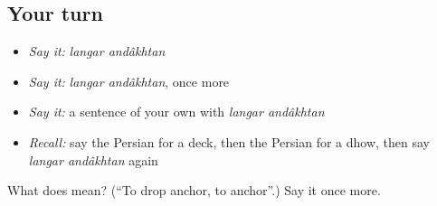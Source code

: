 \subsection*{Your turn}
\begin{itemize}
\raggedright
  \item \emph{Say it:} \emph{langar andâkhtan}
  \item \emph{Say it:} \emph{langar andâkhtan}, once more
  \item \emph{Say it:} a sentence of your own with \emph{langar andâkhtan}
  \item \emph{Recall:} say the Persian for a deck, then the Persian for a dhow, then say \emph{langar andâkhtan} again
\end{itemize}

\begin{tcolorbox}[breakable,colback=teal!4,colframe=teal!35!black,title={Before you move on}]
What does   mean? (\textquotedblleft{}To drop anchor, to anchor\textquotedblright{}.) Say it once more.
\end{tcolorbox}
